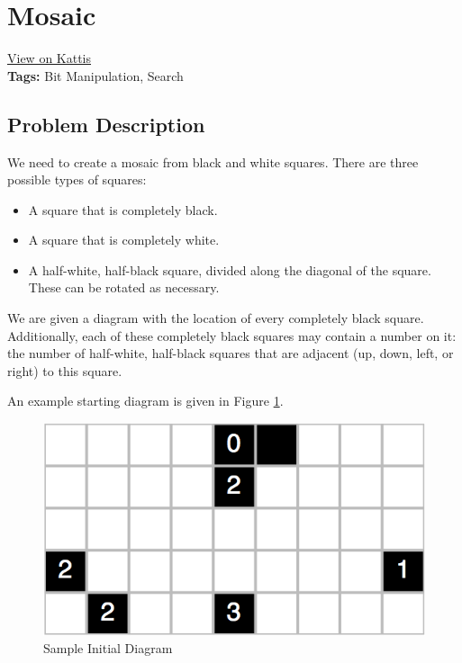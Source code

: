 \section{Mosaic}
\label{mosaic}
\href{https://open.kattis.com/problems/Mosaic}{View on Kattis}\\
\textbf{Tags:} Bit Manipulation, Search\\
\subsection{Problem Description}

We need to create a mosaic from black and white squares. There are three possible
types of squares:

\begin{itemize}
  \item A square that is completely black.
  \item A square that is completely white.
  \item A half-white, half-black square, divided along the diagonal of the square.
  These can be rotated as necessary.
\end{itemize}

We are given a diagram with the location of every completely black square.
Additionally, each of these completely black squares may contain a number on it:
the number of half-white, half-black squares that are adjacent (up, down, left,
or right) to this square.

An example starting diagram is given in Figure \ref{mosaic:initial-diagram}.

\begin{figure}[h!]
  \centering
  \includegraphics{Images/mosaic-initial.png}
  \caption{Sample Initial Diagram}
  \label{mosaic:initial-diagram}
\end{figure}

